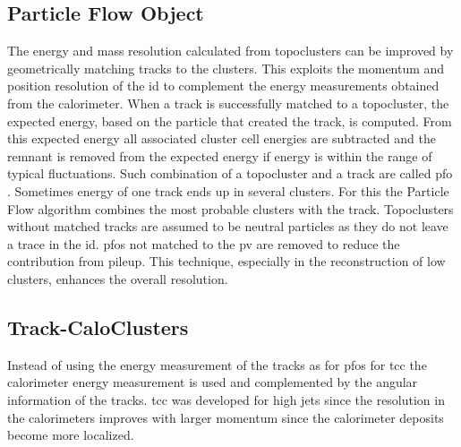 \subsection{Particle Flow Object}\label{sec:particle_flow}
The energy and mass resolution calculated from topoclusters can be improved by geometrically matching tracks to the clusters. This exploits the momentum and position resolution of the \ac{id} to complement the energy measurements obtained from the calorimeter. When a track is successfully matched to a topocluster, the expected energy, based on the particle that created the track, is computed. From this expected energy all associated cluster cell energies are subtracted and the remnant is removed from the expected energy if energy is within the range of typical fluctuations. Such combination of a topocluster and a track are called \ac{pfo} \citep{aaboud2017jet}. Sometimes energy of one track ends up in several clusters. For this the Particle Flow algorithm combines the most probable clusters with the track. Topoclusters without matched tracks are assumed to be neutral particles as they do not leave a trace in the \ac{id}. \acp{pfo} not matched to the \ac{pv} are removed to reduce the contribution from pileup.  This technique, especially in the reconstruction of low \pt clusters, enhances the overall resolution.

\subsection{Track-CaloClusters}
Instead of using the energy measurement of the tracks as for \acp{pfo} for \ac{tcc} the calorimeter energy measurement is used and complemented by the angular information of the tracks. \ac{tcc} was developed for high \pt jets since the resolution in the calorimeters improves with larger momentum since the calorimeter deposits become more localized.


